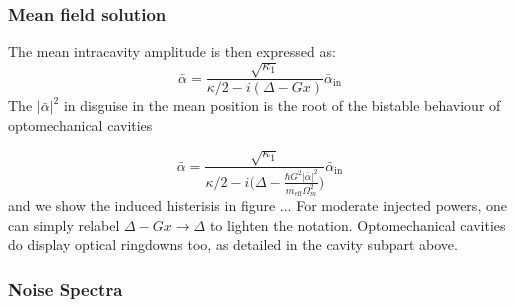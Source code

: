 \subsubsection{Mean field solution}
The mean intracavity amplitude is then expressed as: 
\begin{equation}
  \bar{\alpha} =  \frac{\sqrt{\kappa_1}}{\kappa/2-i(\Delta -G x )}  \bar{\alpha}_{\mathrm{in}} 
\end{equation}
The $|\bar{\alpha}|^2$ in disguise in the mean position is the root of the bistable behaviour of optomechanical cavities 

\begin{equation}
  \bar{\alpha} = \frac{\sqrt{\kappa_1}}{ \kappa/2 - i \Big( \Delta - \frac{\hbar G^2  |\bar{\alpha}|^2}{m_{\text{eff}} \Omega_m^2 } \Big)} \bar{\alpha}_{\text{in}}
\end{equation}
and we show the induced histerisis in figure ... For moderate injected powers, one can simply relabel $\Delta - Gx \rightarrow \Delta$ to lighten the notation. Optomechanical cavities do display optical ringdowns too, as detailed in the cavity subpart above.

\subsubsection{Noise Spectra}


